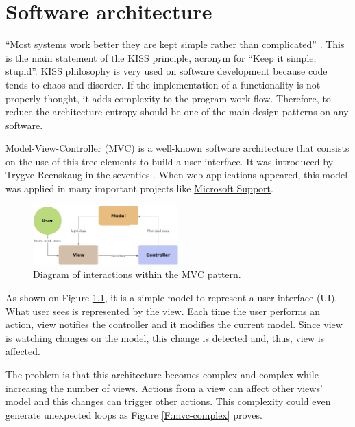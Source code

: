\chapter{Software architecture}
\label{S:architecture}


“Most systems work better they are kept simple rather than complicated”
\cite{kiss-wiki}. This is the main statement of the KISS principle, acronym for
“Keep it simple, stupid”. KISS philosophy is very used on software development
because code tends to chaos and disorder. If the implementation of a
functionality is not properly thought, it adds complexity to the program work
flow. Therefore, to reduce the architecture entropy should be one of the main
design patterns on any software.

Model-View-Controller (MVC) is a well-known software architecture that consists
on the use of this tree elements to build a user interface. It was introduced 
by Trygve Reenskaug in the seventies \cite{mvc-past-present}. When web
applications appeared, this model was applied in many important projects
like \href{https://support.microsoft.com}{Microsoft Support}. 


\begin{figure}[htb]
	\begin{center}
		\includegraphics[width=0.5\textwidth]{./figures/mvc.png}
		\caption{Diagram of interactions within the MVC pattern.
				 \cite{mvc-wiki}}
		\label{F:mvc}
	\end{center}
\end{figure}

As shown on Figure \ref{F:mvc}, it is a simple model to represent a user
interface (UI). What user sees is represented by the view. Each time the user 
performs an action, view notifies the controller and it modifies the current
model. Since view is watching changes on the model, this change is detected and,
thus, view is affected.

The problem is that this architecture becomes complex and complex while 
increasing the number of views. Actions from a view can affect other views'
model and this changes can trigger other actions. This complexity could even
generate unexpected loops as Figure \ref{F:mvc-complex} proves.

